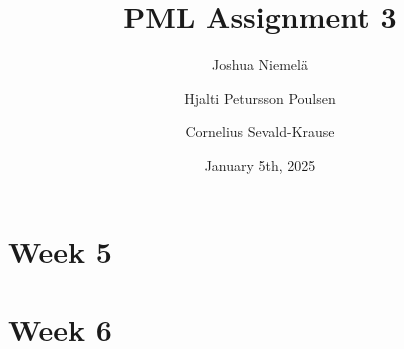\documentclass{article}
\begin{document}
\title{PML Assignment 3}
\author{
  Joshua Niemelä
  \and
  Hjalti Petursson Poulsen
  \and
  Cornelius Sevald-Krause
}
\date{January 5th, 2025}
\maketitle

\section{Week 5}


\section{Week 6}


\appendix

\end{document}
